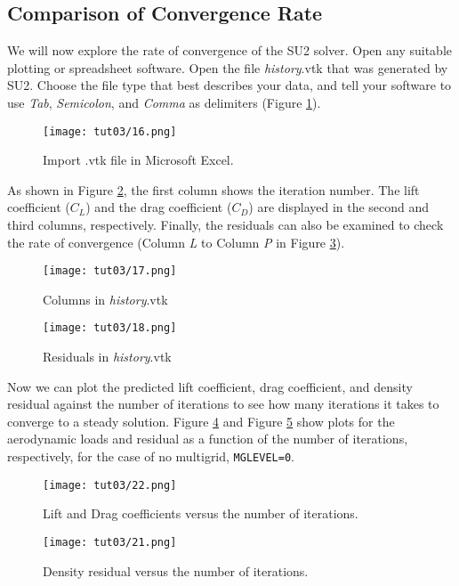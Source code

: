 \subsection{Comparison of Convergence Rate}
We will now explore the rate of convergence of the SU2 solver. Open any suitable plotting or spreadsheet software. Open the file \textit{history}.vtk that was generated by SU2. Choose the file type that best describes your data, and tell your software to use \textit{Tab}, \textit{Semicolon}, and \textit{Comma} as delimiters (Figure \ref{fig3:importvtkxlxs}).
\begin{figure}[htbp]
    \centering
    \texttt{[image: tut03/16.png]}
    \caption{Import .vtk file in Microsoft Excel.}
    \label{fig3:importvtkxlxs}
\end{figure}
As shown in Figure \ref{fig3:columnsxlxs}, the first column shows the iteration number. The lift coefficient ($C_L$) and the drag coefficient ($C_D$) are displayed in the second and third columns, respectively. Finally, the residuals can also be examined to check the rate of convergence (Column \textit{L} to Column \textit{P} in Figure \ref{fig3:residualxlxs}).
\begin{figure}[htbp]
    \centering
    \texttt{[image: tut03/17.png]}
    \caption{Columns in \textit{history}.vtk}
    \label{fig3:columnsxlxs}
\end{figure}
\begin{figure}[htbp]
    \centering
    \texttt{[image: tut03/18.png]}
    \caption{Residuals in \textit{history}.vtk}
    \label{fig3:residualxlxs}
\end{figure}
Now we can plot the predicted lift coefficient, drag coefficient, and density residual against the number of iterations to see how many iterations it takes to converge to a steady solution. Figure \ref{fig3:clcdxlxs} and Figure \ref{fig3:res_vs_itr} show plots for the aerodynamic loads and residual as a function of the number of iterations, respectively, for the case of no multigrid, \texttt{MGLEVEL=0}.
\begin{figure}[htbp]
    \centering
    \texttt{[image: tut03/22.png]}
    \caption{Lift and Drag coefficients versus the number of iterations.}
    \label{fig3:clcdxlxs}
\end{figure}
\begin{figure}[htbp]
    \centering
    \texttt{[image: tut03/21.png]}
    \caption{Density residual versus the number of iterations.}
    \label{fig3:res_vs_itr}
\end{figure}
\clearpage

